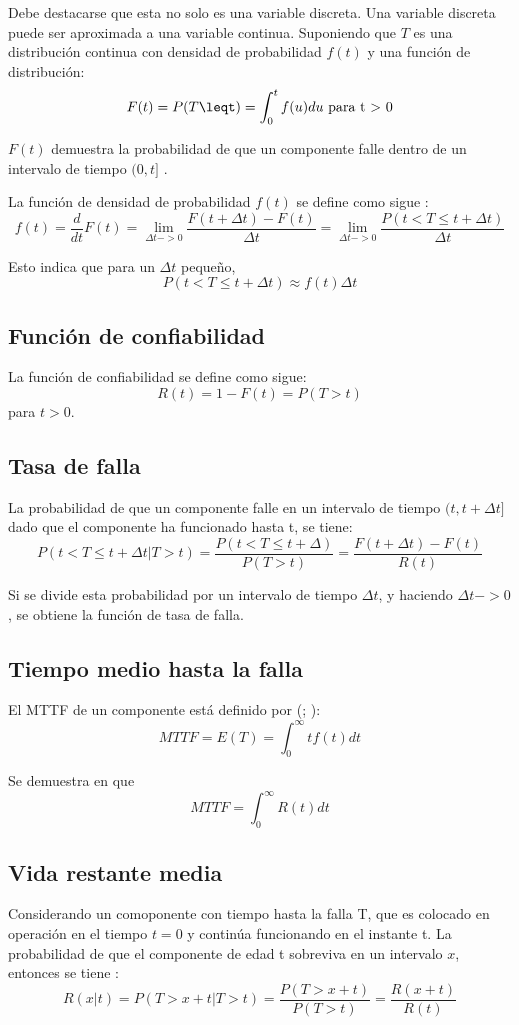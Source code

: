 Debe destacarse que esta no solo es una variable discreta. Una variable discreta puede ser aproximada a una variable continua. Suponiendo que $T$ es una distribución continua con densidad de probabilidad $f(t)$ y una función de distribución: $$F(t) = P(T\leqt) = \int_0^t f(u)du \text{ para t > 0}$$

$F(t)$ demuestra la probabilidad de que un componente falle dentro de un intervalo de tiempo $(0,t]$ \citep{Rausand04}.

La función de densidad de probabilidad $f(t)$ se define como sigue \citep{Rausand04}: $$f(t) = \frac{d}{dt}F(t) = \lim_{\Delta t->0}\frac{F(t+\Delta t) - F(t)}{\Delta t} = \lim_{\Delta t ->0} \frac{P(t<T\leq t + \Delta t)}{\Delta t}$$

Esto indica que para un $\Delta t$ pequeño, $$P(t < T \leq t + \Delta t) \approx f(t)\Delta t$$

\subsection{Función de confiabilidad}
La función de confiabilidad se define como sigue: $$R(t) =  1 - F(t) = P(T>t)$$ para $t>0$.

\subsection{Tasa de falla}
La probabilidad de que un componente falle en un intervalo de tiempo $(t, t+\Delta t]$ dado que el componente ha funcionado hasta t, se tiene: $$P(t < T \leq t + \Delta t | T > t) = \frac{P(t< T \leq t+\Delta)}{P(T>t)} = \frac{F(t+\Delta t) - F(t)}{R(t)}$$

Si se divide esta probabilidad por un intervalo de tiempo $\Delta t$, y haciendo $\Delta t -> 0$, se obtiene la función de tasa de falla.

\subsection{Tiempo medio hasta la falla}
El \ac{MTTF} de un componente está definido por (\citep{FTDesign}; \citep{Rausand04}): $$MTTF = E(T) = \int_0^\infty tf(t)dt$$

Se demuestra en \cite{Rausand04} que $$MTTF = \int_0^\infty R(t)dt$$

\subsection{Vida restante media}
Considerando un comoponente con tiempo hasta la falla T, que es colocado en operación en el tiempo $t = 0$ y continúa funcionando en el instante t.
La probabilidad de que el componente de edad t sobreviva en un intervalo $x$, entonces se tiene
\citep{Rausand04}: $$R(x|t) = P(T>x+t | T>t) = \frac{P(T>x+t)}{P(T>t)} = \frac{R(x+t)}{R(t)}$$

